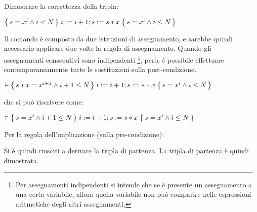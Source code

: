 \begin{exmp}
    Dimostrare la correttezza della tripla:
    \begin{center}
        $\Hoaretriple{s=x^i \land i < N}{i:=i+1; s:=s*x}{s=x^i \land i \le N}$
    \end{center}
    Il comando è composto da due istruzioni di assegnamento, e sarebbe quindi necessario applicare due volte la regola di assegnamento.
    Quando gli assegnamenti consecutivi sono indipendenti \footnote{Per assegnamenti indipendenti si intende che se è presente un assegnamento a una certa variabile, allora quella variabile non può comparire nelle espressioni aritmetiche degli altri assegnamenti.}, però, è possibile effettuare contemporaneamente tutte le sostituzioni sulla post-condizione.
    \begin{center}
        $\vDash \Hoaretriple{s*x=x^{i+1} \land i+1 \le N}{i:=i+1; s:=s*x}{s=x^i \land i \le N}$
    \end{center}
    che si può riscrivere come:
    \begin{center}
        $\vDash \Hoaretriple{s=x^i \land i+1 \le N}{i:=i+1; s:=s*x}{s=x^i \land i \le N}$
    \end{center}
    Per la regola dell'implicazione (sulla pre-condizione):
    \begin{prooftree}
    \end{prooftree}
    Si è quindi riusciti a derivare la tripla di partenza. La tripla di partenza è quindi dimostrata.
\end{exmp}

